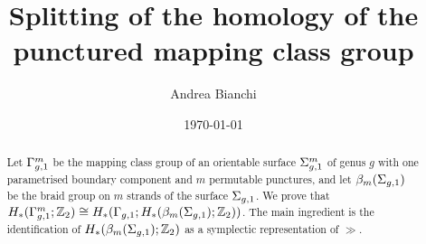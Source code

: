 \documentclass{amsart}
\theoremstyle{plain}
\theoremstyle{definition}
\begin{document}
\title{Splitting of the homology of the punctured mapping class group}

\author{Andrea Bianchi}

\address{Mathematics Institute,
University of Bonn,
Endenicher Allee 60, Bonn,
Germany
}




\date{\today}



\begin{abstract}
Let $\Gamma_{g,1}^m$ be the mapping class group of an orientable surface $\Sigma_{g,1}^m$ of genus $g$ with one parametrised
boundary component and $m$ permutable punctures, and let $\beta_{m}(\Sigma_{g,1})$ be the braid group on $m$ strands
of the surface $\Sigma_{g,1}$. We prove that $H_*(\Gamma_{g,1}^m;\mathbb{Z}_2)\cong H_*(\Gamma_{g,1};H_*(\beta_{m}(\Sigma_{g,1});\mathbb{Z}_2))$. The main ingredient
is the identification of $H_*(\beta_{m}(\Sigma_{g,1});\mathbb{Z}_2)$ as a symplectic representation of $\gg$.
\end{abstract}


\maketitle










% 
% 
% 




{}

\end{document}
